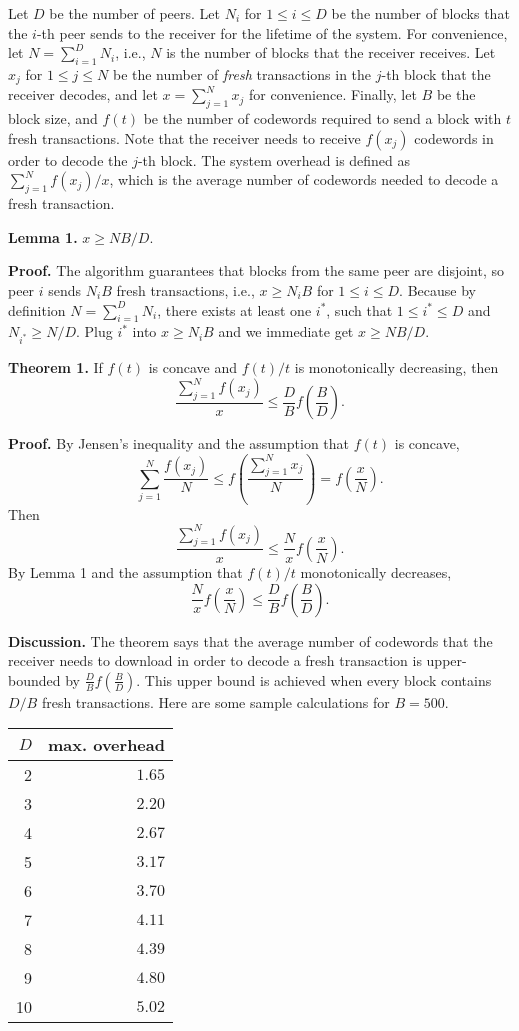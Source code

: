 \documentclass{article}
\begin{document}
Let $D$ be the number of peers. Let $N_i$ for $1 \le i \le D$ be the number of
blocks that the $i$-th peer sends to the receiver for the lifetime of the
system. For convenience, let $N = \sum_{i=1}^D N_i$, i.e., $N$ is the number of
blocks that the receiver receives.  Let $x_j$ for $1 \le j \le N$ be the number
of \emph{fresh} transactions in the $j$-th block that the receiver decodes, and
let $x=\sum_{j=1}^N x_j$ for convenience.  Finally, let $B$ be the block size,
and $f(t)$ be the number of codewords required to send a block with $t$ fresh
transactions. Note that the receiver needs to receive $f(x_j)$ codewords in
order to decode the $j$-th block. The system overhead is defined as
$\sum_{j=1}^N f(x_j)/x$, which is the average number of codewords needed to
decode a fresh transaction.

\smallskip
\noindent
\textbf{Lemma 1.} $x \ge NB/D.$

\smallskip
\noindent \textbf{Proof.} The algorithm guarantees that blocks from the same
peer are disjoint, so peer $i$ sends $N_i B$ fresh transactions, i.e., $x \ge
N_i B$ for $1 \le i \le D$. Because by definition $N=\sum_{i=1}^D N_i$, there
exists at least one $i^*$, such that $1 \le i^* \le D$ and $N_{i^*} \ge N/D$.
Plug $i^*$ into $x \ge N_i B$ and we immediate get $x \ge NB/D$.

\smallskip
\noindent
\textbf{Theorem 1.} If $f(t)$ is concave and $f(t)/t$ is monotonically decreasing, then $$\frac{\sum_{j=1}^N f(x_j)}{x} \le \frac{D}{B}f\left(\frac{B}{D}\right).$$ 

\smallskip \noindent \textbf{Proof.} By Jensen's inequality and the assumption
that $f(t)$ is concave, $$\sum_{j=1}^N \frac{f(x_j)}{N} \le
f\left(\frac{\sum_{j=1}^N x_j}{N}\right) = f\left(\frac{x}{N}\right).$$ Then
$$\frac{\sum_{j=1}^N f(x_j)}{x} \le \frac{N}{x}f\left(\frac{x}{N}\right).$$ By
Lemma 1 and the assumption that $f(t)/t$ monotonically decreases,
$$\frac{N}{x}f\left(\frac{x}{N}\right) \le
\frac{D}{B}f\left(\frac{B}{D}\right).$$ 

\smallskip \noindent \textbf{Discussion.} The theorem says that the average
number of codewords that the receiver needs to download in order to decode a
fresh transaction is upper-bounded by $\frac{D}{B}f\left(\frac{B}{D}\right)$.
This upper bound is achieved when every block contains $D/B$ fresh transactions.
Here are some sample calculations for $B=500$.

\begin{center}
\begin{tabular}{ r|r }
    \hline
    $D$ & max. overhead\\\hline
    2 & $1.65$ \\
    3 & $2.20$ \\
    4 & $2.67$ \\
    5 & $3.17$ \\
    6 & $3.70$ \\
    7 & $4.11$ \\
    8 & $4.39$ \\
    9 & $4.80$ \\
    10 & $5.02$ \\
 \hline
\end{tabular}
\end{center}
\end{document}
